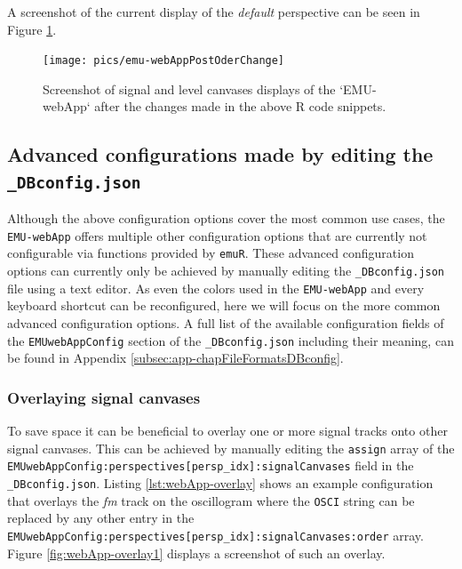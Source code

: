 \documentclass[]{book}
\begin{document}
A screenshot of the current display of the \emph{default} perspective can be seen in Figure \ref{fig:webApp-postOderChange}.

\begin{figure}

{\centering \texttt{[image: pics/emu-webAppPostOderChange]} 

}

\caption{Screenshot of signal and level canvases displays of the `EMU-webApp` after the changes made in the above R code snippets.}\label{fig:webApp-postOderChange}
\end{figure}

\hypertarget{subsec:emu-webAppAdvancedConfig}{%
\subsection{\texorpdfstring{Advanced configurations made by editing the \texttt{\_DBconfig.json}}{Advanced configurations made by editing the \_DBconfig.json}}\label{subsec:emu-webAppAdvancedConfig}}

Although the above configuration options cover the most common use cases, the \texttt{EMU-webApp} offers multiple other configuration options that are currently not configurable via functions provided by \texttt{emuR}. These advanced configuration options can currently only be achieved by manually editing the \texttt{\_DBconfig.json} file using a text editor. As even the colors used in the \texttt{EMU-webApp} and every keyboard shortcut can be reconfigured, here we will focus on the more common advanced configuration options. A full list of the available configuration fields of the \texttt{EMUwebAppConfig} section of the \texttt{\_DBconfig.json} including their meaning, can be found in Appendix \ref{subsec:app-chapFileFormatsDBconfig}.

\hypertarget{overlaying-signal-canvases}{%
\subsubsection{Overlaying signal canvases}\label{overlaying-signal-canvases}}

To save space it can be beneficial to overlay one or more signal tracks onto other signal canvases. This can be achieved by manually editing the \texttt{assign} array of the \texttt{EMUwebAppConfig:perspectives{[}persp\_idx{]}:signalCanvases} field in the \texttt{\_DBconfig.json}. Listing \ref{lst:webApp-overlay} shows an example configuration that overlays the \emph{fm} track on the oscillogram where the \texttt{OSCI} string can be replaced by any other entry in the \texttt{EMUwebAppConfig:perspectives{[}persp\_idx{]}:signalCanvases:order} array. Figure \ref{fig:webApp-overlay1} displays a screenshot of such an overlay.
\end{document}
